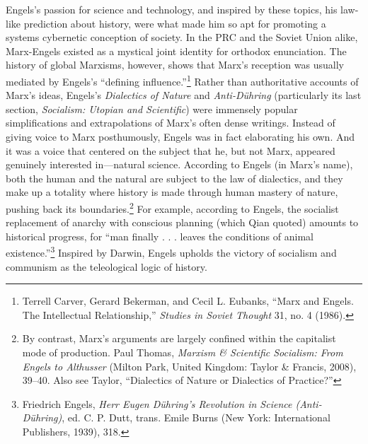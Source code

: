 \documentclass{tufte-handout}
\begin{document}
\begin{CJK*}{UTF8}{gbsn}
\noindent Engels's passion for science and technology, and inspired by these
topics, his law-like prediction about history, were what made him so apt
for promoting a systems cybernetic conception of society. In the PRC and
the Soviet Union alike, Marx-Engels existed as a mystical joint identity
for orthodox enunciation. The history of global Marxisms, however, shows
that Marx's reception was usually mediated by Engels's ``defining
influence.''\footnote{Terrell Carver, Gerard Bekerman, and Cecil L.
  Eubanks, ``Marx and Engels. The Intellectual Relationship,''
  \emph{Studies in Soviet Thought} 31, no. 4 (1986).} Rather than
authoritative accounts of Marx's ideas, Engels's \emph{Dialectics of
Nature} and \emph{Anti-Dühring} (particularly its last section,
\emph{Socialism: Utopian and Scientific}) were immensely popular
simplifications and extrapolations of Marx's often dense writings.
Instead of giving voice to Marx posthumously, Engels was in fact
elaborating his own. And it was a voice that centered on the subject
that he, but not Marx, appeared genuinely interested in---natural
science. According to Engels (in Marx's name), both the human and the
natural are subject to the law of dialectics, and they make up a
totality where history is made through human mastery of nature, pushing
back its boundaries.\footnote{By contrast, Marx's arguments are largely
  confined within the capitalist mode of production. Paul Thomas,
  \emph{Marxism \& Scientific Socialism: From Engels to Althusser}
  (Milton Park, United Kingdom: Taylor \& Francis, 2008), 39--40. Also
  see Taylor, ``Dialectics of Nature or Dialectics of Practice?''} For
example, according to Engels, the socialist replacement of anarchy with
conscious planning (which Qian quoted) amounts to historical progress,
for ``man finally . . . leaves the conditions of animal
existence.''\footnote{Friedrich Engels, \emph{Herr Eugen Dühring's
  Revolution in Science (Anti-Dühring)}, ed. C. P. Dutt, trans. Emile
  Burns (New York: International Publishers, 1939), 318.} Inspired by
Darwin, Engels upholds the victory of socialism and communism as the
teleological logic of history.


\end{CJK*}
\end{document}
